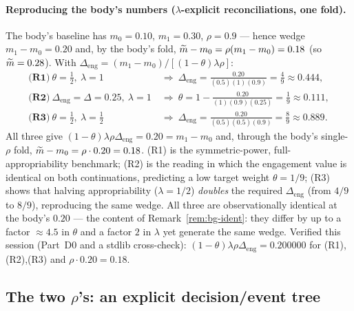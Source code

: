 \paragraph{Reproducing the body's numbers ($\lambda$-explicit reconciliations,
one fold).}
The body's baseline has $m_{0}=0.10$, $m_{1}=0.30$, $\rho=0.9$ --- hence wedge
$m_{1}-m_{0}=0.20$ and, by the body's fold, $\widetilde{m}-m_{0}=\rho(m_{1}-m_{0})=0.18$
(so $\widetilde{m}=0.28$). With $\Delta_{\mathrm{eng}}=(m_{1}-m_{0})/[(1-\theta)\lambda
\rho]$:
\begin{align}
  \textbf{(R1)}\ \theta=\tfrac12,\ \lambda=1 \ &\Longrightarrow\
    \Delta_{\mathrm{eng}}=\frac{0.20}{(0.5)(1)(0.9)}=\tfrac49\approx0.444,
    \label{eq:bg-R1}\\
  \textbf{(R2)}\ \Delta_{\mathrm{eng}}=\Delta=0.25,\ \lambda=1 \ &\Longrightarrow\
    \theta=1-\frac{0.20}{(1)(0.9)(0.25)}=\tfrac19\approx0.111,
    \label{eq:bg-R2}\\
  \textbf{(R3)}\ \theta=\tfrac12,\ \lambda=\tfrac12 \ &\Longrightarrow\
    \Delta_{\mathrm{eng}}=\frac{0.20}{(0.5)(0.5)(0.9)}=\tfrac89\approx0.889.
    \label{eq:bg-R3}
\end{align}
All three give $(1-\theta)\lambda\rho\Delta_{\mathrm{eng}}=0.20=m_{1}-m_{0}$ and,
through the body's single-$\rho$ fold, $\widetilde{m}-m_{0}=\rho\cdot0.20=0.18$. (R1) is
the symmetric-power, full-appropriability benchmark; (R2) is the reading in which
the engagement value is identical on both continuations, predicting a low target
weight $\theta=1/9$; (R3) shows that halving appropriability ($\lambda=1/2$)
\emph{doubles} the required $\Delta_{\mathrm{eng}}$ (from $4/9$ to $8/9$),
reproducing the same wedge. All three are observationally identical at the body's
$0.20$ --- the content of Remark~\ref{rem:bg-ident}: they differ by up to a factor
$\approx4.5$ in $\theta$ and a factor $2$ in $\lambda$ yet generate the same wedge.
Verified this session (Part~D0 and a stdlib cross-check): $(1-\theta)\lambda\rho
\Delta_{\mathrm{eng}}=0.200000$ for (R1),(R2),(R3) and $\rho\cdot0.20=0.18$.

\subsection{The two \texorpdfstring{$\rho$}{rho}'s: an explicit decision/event tree}
\label{app:bg-tree}

